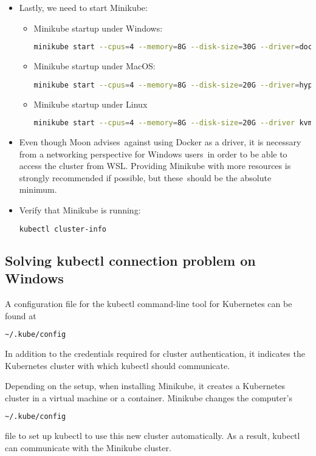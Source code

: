 \begin{itemize}
	\item Lastly, we need to start Minikube:
	\begin{itemize}
		\item Minikube startup under Windows:
		\begin{lstlisting}[language=bash]
			minikube start --cpus=4 --memory=8G --disk-size=30G --driver=docker
		\end{lstlisting}
		\item Minikube startup under MacOS:
		\begin{lstlisting}[language=bash]
			minikube start --cpus=4 --memory=8G --disk-size=20G --driver=hyperkit
		\end{lstlisting}
		\item Minikube startup under Linux
		\begin{lstlisting}[language=bash]
			minikube start --cpus=4 --memory=8G --disk-size=20G --driver kvm2
		\end{lstlisting}
	\end{itemize}
	\item Even though Moon advises against using Docker as a driver, it is necessary from a networking perspective for Windows users in order to be able to access the cluster from WSL. Providing Minikube with more resources is strongly recommended if possible, but these should be the absolute minimum.
	\item Verify that Minikube is running:
	\begin{lstlisting}[language=bash]
		kubectl cluster-info
	\end{lstlisting}
\end{itemize}

\subsection{Solving kubectl connection problem on Windows}

A configuration file for the kubectl command-line tool for Kubernetes can be found at 
\begin{lstlisting}[language=bash] 
~/.kube/config
\end{lstlisting}
In addition to the credentials required for cluster authentication, it indicates the Kubernetes cluster with which kubectl should communicate.

Depending on the setup, when installing Minikube, it creates a Kubernetes cluster in a virtual machine or a container. Minikube changes the computer's
\begin{lstlisting}[language=bash]
~/.kube/config
\end{lstlisting}
file to set up kubectl to use this new cluster automatically. As a result, kubectl can communicate with the Minikube cluster.

